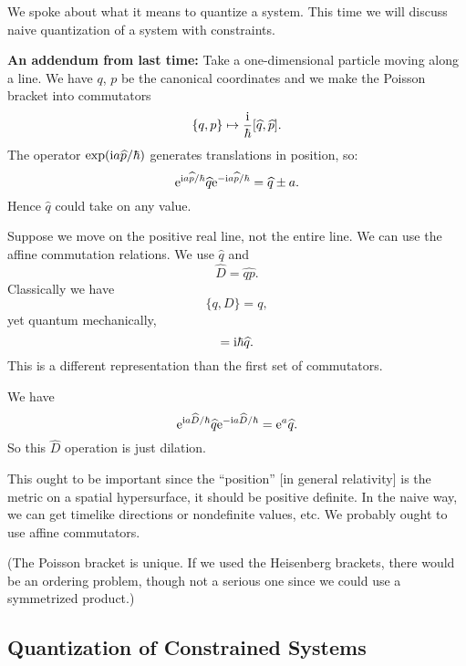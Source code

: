 \lecture

We spoke about what it means to quantize a system. This time we will
discuss naive quantization of a system with constraints.

\textbf{An addendum from last time:} Take a one-dimensional particle
moving along a line. We have $q$, $p$ be the canonical coordinates and
we make the Poisson bracket into commutators
\begin{equation}
\{q,p\}\mapsto\frac{\mathrm{i}}{\hbar}[\widehat{q},\widehat{p}].
\end{equation}
The operator $\exp(\mathrm{i} a\widehat{p}/\hbar)$ generates translations in
position, so:
\begin{equation}
\mathrm{e}^{\mathrm{i} a\widehat{p}/\hbar}\widehat{q}\mathrm{e}^{-\mathrm{i} a\widehat{p}/\hbar}=\widehat{q}\pm a.
\end{equation}
Hence $\widehat{q}$ could take on any value.

Suppose we move on the positive real line, not the entire line. We can
use the affine commutation relations. We use $\widehat{q}$ and
\begin{equation}
\widehat{D} = \widehat{qp}.
\end{equation}
Classically we have
\begin{equation}
\{q,D\}=q,
\end{equation}
yet quantum mechanically,
\begin{equation}
[\widehat{q},\widehat{D}]=\I\hbar\widehat{q}.
\end{equation}
This is a different representation than the first set of commutators.

We have
\begin{equation}
\mathrm{e}^{\mathrm{i} a\widehat{D}/\hbar}\widehat{q}\mathrm{e}^{-\mathrm{i} a\widehat{D}/\hbar} = \mathrm{e}^{a}\widehat{q}.
\end{equation}
So this $\widehat{D}$ operation is just dilation.

This ought to be important since the ``position'' [in general
  relativity] is the metric on a spatial hypersurface, it should be
positive definite. In the naive way, we can get timelike directions or
nondefinite values, etc. We probably ought to use affine commutators.

(The Poisson bracket is unique. If we used the Heisenberg brackets, there
would be an ordering problem, though not a serious one since we could
use a symmetrized product.)

\subsection{Quantization of Constrained Systems}

